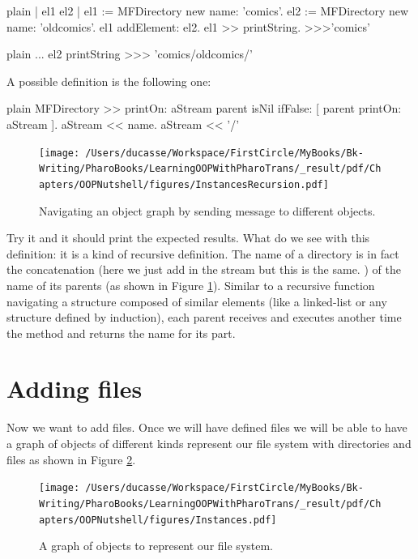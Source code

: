 \documentclass[10pt,twoside,english]{_support/latex/sbabook/sbabook}
\begin{document}
\begin{displaycode}{plain}
| el1 el2 |
el1 := MFDirectory new name: 'comics'.
el2 := MFDirectory new name: 'oldcomics'.
el1 addElement: el2.
el1 >> printString.
>>>'comics'
\end{displaycode}

\begin{displaycode}{plain}
	...
el2 printString
>>> 'comics/oldcomics/'
\end{displaycode}

A possible definition is the following one:

\begin{displaycode}{plain}
MFDirectory >> printOn: aStream
	parent isNil 
		ifFalse: [ parent printOn: aStream ].
	aStream << name.
	aStream << '/'
\end{displaycode}


\begin{figure}

\begin{center}
\texttt{[image: /Users/ducasse/Workspace/FirstCircle/MyBooks/Bk-Writing/PharoBooks/LearningOOPWithPharoTrans/\_result/pdf/Chapters/OOPNutshell/figures/InstancesRecursion.pdf]}\caption{Navigating an object graph by sending message to different objects. \label{InstancesRecursion}}\end{center}
\end{figure}


Try it and it should print the expected results.
What do we see with this definition: it is a kind of recursive definition. The name of a directory is in fact the concatenation (here we just add in the stream but this is the same. ) of the name of its parents (as shown in Figure \ref{InstancesRecursion}).
Similar to a recursive function navigating a structure composed of similar elements (like a linked-list or any structure defined by induction), each parent receives and executes another time the  method and returns the name for its part.
\section{Adding files}
Now we want to add files. Once we will have defined files we will be able to have a graph of objects of different kinds represent our file system with directories and files as shown in Figure \ref{Instances}.


\begin{figure}

\begin{center}
\texttt{[image: /Users/ducasse/Workspace/FirstCircle/MyBooks/Bk-Writing/PharoBooks/LearningOOPWithPharoTrans/\_result/pdf/Chapters/OOPNutshell/figures/Instances.pdf]}\caption{A graph of objects to represent our file system. \label{Instances}}\end{center}
\end{figure}
\end{document}
